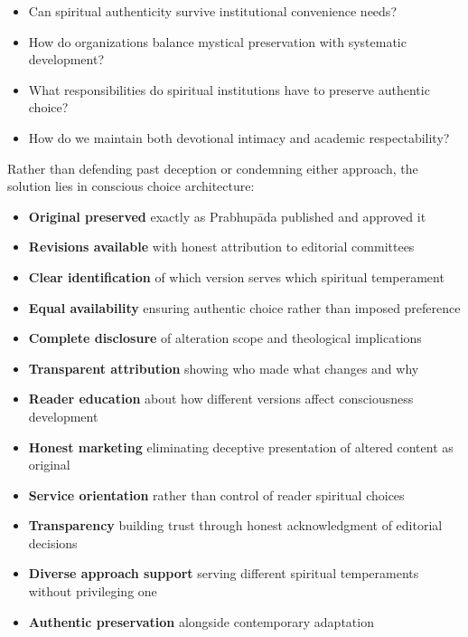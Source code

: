 \documentclass[12pt,twoside]{book}
\begin{document}
\begin{itemize}
\item Can spiritual authenticity survive institutional convenience needs?
\item How do organizations balance mystical preservation with systematic development?
\item What responsibilities do spiritual institutions have to preserve authentic choice?
\item How do we maintain both devotional intimacy and academic respectability?
\end{itemize}


Rather than defending past deception or condemning either approach, the solution lies in conscious choice architecture:

\begin{itemize}
\item \textbf{\textbf{Original preserved}} exactly as Prabhupāda published and approved it
\item \textbf{\textbf{Revisions available}} with honest attribution to editorial committees
\item \textbf{\textbf{Clear identification}} of which version serves which spiritual temperament
\item \textbf{\textbf{Equal availability}} ensuring authentic choice rather than imposed preference

\item \textbf{\textbf{Complete disclosure}} of alteration scope and theological implications
\item \textbf{\textbf{Transparent attribution}} showing who made what changes and why
\item \textbf{\textbf{Reader education}} about how different versions affect consciousness development
\item \textbf{\textbf{Honest marketing}} eliminating deceptive presentation of altered content as original

\item \textbf{\textbf{Service orientation}} rather than control of reader spiritual choices
\item \textbf{\textbf{Transparency}} building trust through honest acknowledgment of editorial decisions
\item \textbf{\textbf{Diverse approach support}} serving different spiritual temperaments without privileging one
\item \textbf{\textbf{Authentic preservation}} alongside contemporary adaptation
\end{itemize}
\end{document}
